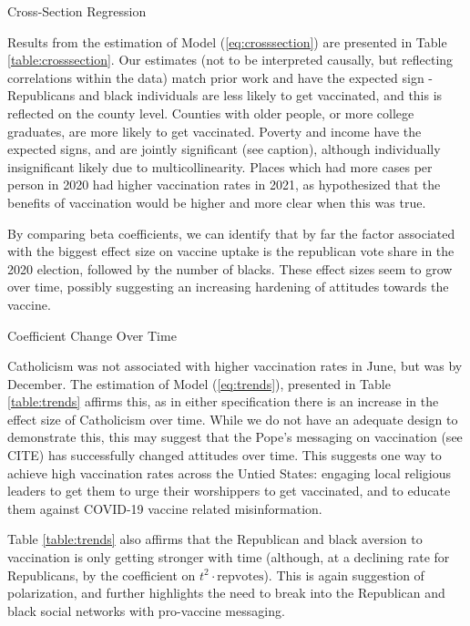 \documentclass[12pt]{article}
\begin{document}
\begin{spacing}{1.5}
		\begin{table}
			\centering
			\caption{Cross-Section Regression}
			\centerline{}
			\label{table:crosssection}
		\end{table}
		
		Results from the estimation of Model (\ref{eq:crosssection}) are presented in Table \ref{table:crosssection}. Our estimates (not to be interpreted causally, but reflecting correlations within the data) match prior work and have the expected sign - Republicans and black individuals are less likely to get vaccinated, and this is reflected on the county level. Counties with older people, or more college graduates, are more likely to get vaccinated. Poverty and income have the expected signs, and are jointly significant (see caption), although individually insignificant likely due to multicollinearity. Places which had more cases per person in 2020 had higher vaccination rates in 2021, as hypothesized that the benefits of vaccination would be higher and more clear when this was true.
		
		By comparing beta coefficients, we can identify that by far the factor associated with the biggest effect size on vaccine uptake is the republican vote share in the 2020 election, followed by the number of blacks. These effect sizes seem to grow over time, possibly suggesting an increasing hardening of attitudes towards the vaccine.
		
		\begin{table}
			\centering
			\caption{Coefficient Change Over Time}
			\centerline{}
			\label{table:trends}
		\end{table}
		
		Catholicism was not associated with higher vaccination rates in June, but was by December. The estimation of Model (\ref{eq:trends}), presented in Table \ref{table:trends} affirms this, as in either specification there is an increase in the effect size of Catholicism over time. While we do not have an adequate design to demonstrate this, this may suggest that the Pope's messaging on vaccination (see CITE) has successfully changed attitudes over time. This suggests one way to achieve high vaccination rates across the Untied States: engaging local religious leaders to get them to urge their worshippers to get vaccinated, and to educate them against COVID-19 vaccine related misinformation.
		
		Table \ref{table:trends} also affirms that the Republican and black aversion to vaccination is only getting stronger with time (although, at a declining rate for Republicans, by the coefficient on $t^2\cdot \textrm{repvotes}$). This is again suggestion of polarization, and further highlights the need to break into the Republican and black social networks with pro-vaccine messaging.
		

\end{spacing}
\end{document}
